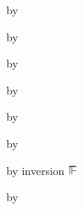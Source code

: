 {\begin{lamportproof*}
    \begin{pfproof}
      \qedstep
        \begin{pfproof}
          by \pfih
        \end{pfproof}
    \end{pfproof}

    \begin{pfproof}
      \qedstep
        \begin{pfproof}
          by \pfih
        \end{pfproof}
    \end{pfproof}

    \begin{pfproof}
      \qedstep
        \begin{pfproof}
          by \pfih
        \end{pfproof}
    \end{pfproof}

    \begin{pfproof}
      \qedstep
        \begin{pfproof}
          by \pfih
        \end{pfproof}
    \end{pfproof}

    \begin{pfproof}
      \qedstep
        \begin{pfproof}
          by \pfih
        \end{pfproof}
    \end{pfproof}

    \begin{pfproof}
      \qedstep
        \begin{pfproof}
          by \pfih
        \end{pfproof}
    \end{pfproof}

    \begin{pfproof}
        \begin{pfproof}
          by inversion $\sWSOP$
        \end{pfproof}
      \qedstep
        \begin{pfproof}
          by \pfih
        \end{pfproof}
    \end{pfproof}

\end{lamportproof*}}

